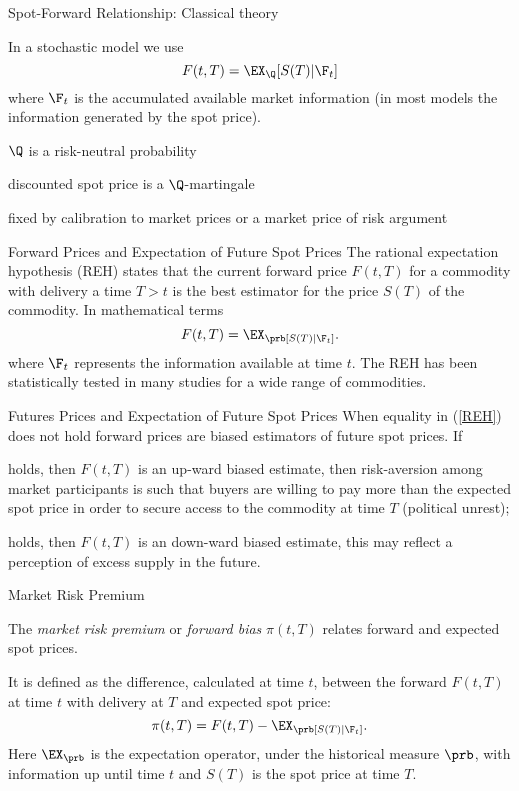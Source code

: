 
{Spot-Forward Relationship: Classical theory}


	In a stochastic model we use
$$
F(t,T)=\EX_{\Q}[S(T)|\F_t]
$$
where $\F_t$ is the accumulated available market information (in most models the information generated by the spot price).

	$\Q$ is a risk-neutral probability


	discounted spot price is a $\Q$-martingale

	fixed by calibration to market prices or a market price of risk argument



{Forward Prices and Expectation of Future Spot Prices}
The rational expectation hypothesis (REH) states that the current forward price $F(t,T)$ for a commodity with
delivery a time $T>t$ is the best estimator for the price $S(T)$ of the commodity.
In mathematical terms
\begin{equation}\label{REH}
F(t,T) = \EX_\prb[S(T) |\F_t].
\end{equation}
where $\F_t$ represents the information available at time $t$. The REH has been statistically
tested in many studies for a wide range of commodities.

{Futures Prices and Expectation of Future Spot Prices}
When equality in (\ref{REH}) does not hold forward prices are biased estimators of
future spot prices. If


	holds, then $F(t,T)$ is an up-ward biased estimate, then risk-aversion
among market participants is such that buyers are willing to pay more than the expected
spot price in order to secure access to the commodity at time $T$ (political unrest);

	holds, then $F(t,T)$ is an down-ward biased estimate, this may reflect a
perception of excess supply in the future.


{Market Risk Premium}


	The \emph{market risk premium} or \emph{forward bias} $\pi (t,T)$
relates forward and expected spot prices.

	It is defined as the difference, calculated at time $t$, between
the forward $F(t,T)$ at time $t$ with delivery at $T$ and expected
spot price:
\begin{equation}\label{forward risk premium}
\pi(t,T)= F(t,T)-\EX_\prb[S(T)| \F_t].
\end{equation}
Here $\EX_\prb$ is the expectation operator, under the
historical measure $\prb$, with information up until time $t$ and
$S(T)$ is the spot price at time $T$.


